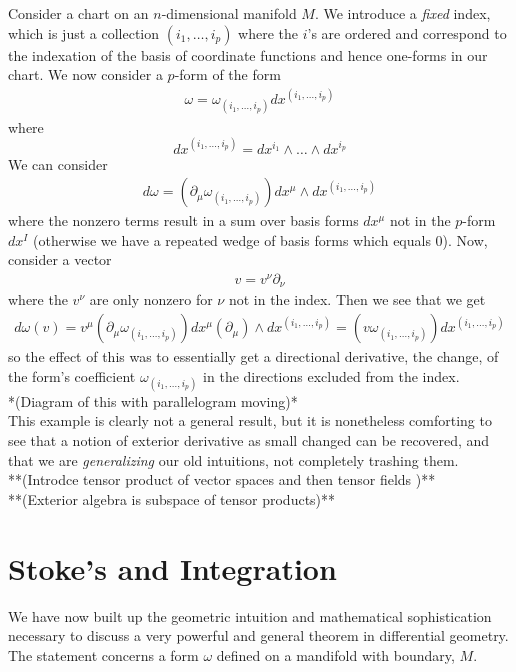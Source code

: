   Consider a chart on an $n$-dimensional manifold $M$.  We introduce a \textit{fixed} index, which is just a collection $(i_1, \dots, i_p)$ where the $i$'s are ordered and correspond to the indexation of the basis of coordinate functions and hence one-forms in our chart.  We now consider a $p$-form of the form
  \begin{align*}
  	\omega = \omega_{(i_1, \dots, i_p)} dx^{(i_1, \dots, i_p)}
  \end{align*}
  where 
  \begin{equation*}
  	dx^{(i_1, \dots, i_p)} = dx^{i_1}\wedge \dots \wedge dx^{i_p}
  \end{equation*}
  We can consider 
  \begin{align*}
  	d\omega = (\partial_\mu\omega_{(i_1, \dots, i_p)})dx^\mu \wedge dx^{(i_1, \dots, i_p)}
  \end{align*}
  where the nonzero terms result in a sum over basis forms $dx^\mu$ not in the $p$-form $dx^I$ (otherwise we have a repeated wedge of basis forms which equals 0).  Now, consider a vector 
  \begin{align*}
  	v = v^\nu\partial_\nu
  \end{align*}
 where the $v^\nu$ are only nonzero for $\nu$ not in the index.  Then we see that we get
 \begin{align*}
 	d\omega(v) = v^\mu(\partial_\mu \omega_{(i_1, \dots, i_p)})dx^\mu(\partial_\mu)\wedge dx^{(i_1, \dots, i_p)}  = (v \omega_{(i_1, \dots, i_p)})dx^{(i_1, \dots, i_p)}
 \end{align*}
 so the effect of this was to essentially get a directional derivative, the change, of the form's coefficient $\omega_{(i_1, \dots, i_p)}$ in the directions excluded from the index.\\   
 
 *(Diagram of this with parallelogram moving)*\\
 
 This example is clearly not a general result, but it is nonetheless comforting to see that a notion of exterior derivative as small changed can be recovered, and that we are \textit{generalizing} our old intuitions, not completely trashing them.\\
 
 **(Introdce tensor product of vector spaces and then tensor fields )**\\
 
 **(Exterior algebra is subspace of tensor products)**
\section*{Stoke's and Integration}
We have now built up the geometric intuition and mathematical sophistication necessary to discuss a very powerful and general theorem in differential geometry.  The statement concerns a form $\omega$ defined on a mandifold with boundary, $M$. \\

